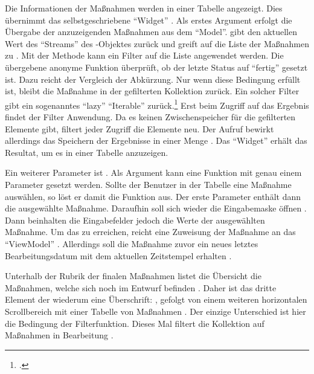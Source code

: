 Die Informationen der Maßnahmen werden in einer Tabelle angezeigt.
Dies übernimmt das selbstgeschriebene \enquote{Widget}  .
Als erstes Argument erfolgt die Übergabe der anzuzeigenden Maßnahmen aus dem \enquote{Model}.
 gibt den aktuellen Wert des \enquote{Streams} des -Objektes zurück und greift auf die Liste der Maßnahmen zu .
Mit der Methode   kann ein Filter auf die Liste angewendet werden.
Die übergebene anonyme Funktion  überprüft, ob der letzte Status auf \enquote{fertig} gesetzt ist.
Dazu reicht der Vergleich der Abkürzung.
Nur wenn diese Bedingung erfüllt ist,
bleibt die Maßnahme in der gefilterten Kollektion zurück.
Ein solcher Filter gibt ein sogenanntes \enquote{lazy} \enquote{Iterable} zurück.\footcite[Vgl.][]{FlutterWhereMethod}
Erst beim Zugriff auf das Ergebnis findet der Filter Anwendung.
Da es keinen Zwischenspeicher für die gefilterten Elemente gibt,
filtert jeder Zugriff die Elemente neu.
Der Aufruf  bewirkt allerdings das Speichern der Ergebnisse in einer Menge .
Das \enquote{Widget}  erhält das Resultat,
um es in einer Tabelle anzuzeigen.

Ein weiterer Parameter ist  .
Als Argument kann eine Funktion mit genau einem Parameter gesetzt werden.
Sollte der Benutzer in der Tabelle eine Maßnahme auswählen, so löst er damit die Funktion aus.
Der erste Parameter enthält dann die ausgewählte Maßnahme.
Daraufhin soll sich wieder die Eingabemaske öffnen .
Dann beinhalten die Eingabefelder jedoch die Werte der ausgewählten Maßnahme.
Um das zu erreichen, reicht eine Zuweisung der Maßnahme an das \enquote{ViewModel} .
Allerdings soll die Maßnahme zuvor ein neues letztes Bearbeitungsdatum mit dem aktuellen Zeitstempel erhalten .

Unterhalb der Rubrik der finalen Maßnahmen listet die Übersicht die Maßnahmen, welche sich noch im Entwurf befinden .
Daher ist das dritte Element der  wiederum eine Überschrift:  , gefolgt von einem weiteren horizontalen Scrollbereich  mit einer Tabelle von Maßnahmen .
Der einzige Unterschied ist hier die Bedingung der Filterfunktion.
Dieses Mal filtert die Kollektion auf Maßnahmen in Bearbeitung .

